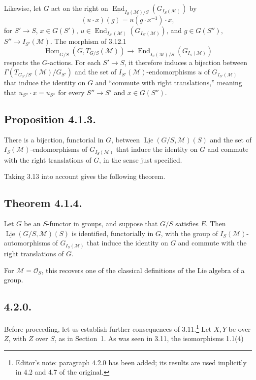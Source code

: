 Likewise, let \(G\) act on the right on
\(\underline{\operatorname{End}}_{I_S(\mathcal M)/S}
(G_{I_S(\mathcal M)})\) by
\[
 (u\cdot x)(g)=u(g\cdot x^{-1})\cdot x,
\]
for \(S'\to S\), \(x\in G(S')\),
\(u\in\operatorname{End}_{I_{S'}(\mathcal M)}
(G_{I_{S'}(\mathcal M)})\), and \(g\in G(S'')\),
\(S''\to I_{S'}(\mathcal M)\). The morphism of 3.12.1
\[
 \underline{\operatorname{Hom}}_{G/S}(G,T_{G/S}(\mathcal M))
 \longrightarrow
 \underline{\operatorname{End}}_{I_S(\mathcal M)/S}
   (G_{I_S(\mathcal M)})
\]
respects the \(G\)-actions. For each \(S'\to S\), it therefore induces a
bijection between
\(\Gamma(T_{G_{S'}/S'}(\mathcal M)/G_{S'})\) and the set of
\(I_{S'}(\mathcal M)\)-endomorphisms \(u\) of
\(G_{I_{S'}(\mathcal M)}\) that induce the identity on \(G\) and
``commute with right translations,'' meaning that
\(u_{S''}\cdot x=u_{S''}\) for every \(S''\to S'\) and
\(x\in G(S'')\).

\subsection*{Proposition 4.1.3.}
There is a bijection, functorial in \(G\), between
\(\underline{\operatorname{Lie}}(G/S,\mathcal M)(S)\) and the set of
\(I_S(\mathcal M)\)-endomorphisms of \(G_{I_S(\mathcal M)}\) that
induce the identity on \(G\) and commute with the right translations of
\(G\), in the sense just specified.

Taking 3.13 into account gives the following theorem.

\subsection*{Theorem 4.1.4.}
Let \(G\) be an \(S\)-functor in groups, and suppose that \(G/S\)
satisfies \(E\). Then
\(\underline{\operatorname{Lie}}(G/S,\mathcal M)(S)\) is identified,
functorially in \(G\), with the group of
\(I_S(\mathcal M)\)-automorphisms of \(G_{I_S(\mathcal M)}\) that
induce the identity on \(G\) and commute with the right translations of
\(G\).

For \(\mathcal M=\mathcal O_S\), this recovers one of the classical
definitions of the Lie algebra of a group.

\subsection*{4.2.0.}
Before proceeding, let us establish further consequences of
3.11.\footnote{Editor's note: paragraph 4.2.0 has been added; its results
are used implicitly in 4.2 and 4.7 of the original.} Let
\(X,Y\) be over \(Z\), with \(Z\) over \(S\), as in Section~1. As was
seen in 3.11, the isomorphisms 1.1(4)

